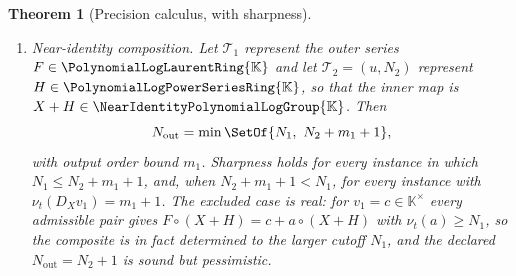 \documentclass[11pt,oneside]{article}
\theoremstyle{plain}
\newtheorem{theorem}{Theorem}[section]
\theoremstyle{definition}
\theoremstyle{remark}
\newcommand{\K}{\mathbb{K}}
\newcommand{\PLpow}{\PolynomialLogPowerSeriesRing{\K}}   %
\newcommand{\PLlau}{\PolynomialLogLaurentRing{\K}}       %
\newcommand{\Gnear}{\NearIdentityPolynomialLogGroup{\K}} %
\newcommand{\ordt}{\nu_{t}}                              %
\newcommand{\DX}{D_{X}}                                  %
\newcommand{\compose}{\mathbin{\circ}}
\begin{document}
\begin{theorem}[Precision calculus, with sharpness]
\begin{enumerate}
      \(m_1=0\) and \(v_1(0)\in\K^{\times}\); in that exceptional case the true
      order is strictly larger and must be recomputed from the returned
      canonical form (\cref{plt:rmk:alg-derived-order}).
\item\label{plt:thm:alg-precision-calculus:comp}
      \emph{Near-identity composition.}  Let \(\mathcal T_1\) represent the
      outer series \(F\in\PLlau\) and let \(\mathcal T_2=(u,N_2)\) represent
      \(H\in\PLpow\), so that the inner map is \(X+H\in\Gnear\).  Then
      \[
        N_{\mathrm{out}}=\min\SetOf{N_1,\ N_2+m_1+1},
      \]
      with output order bound \(m_1\).  Sharpness holds for every instance in
      which \(N_1\le N_2+m_1+1\), and, when \(N_2+m_1+1<N_1\), for every
      instance with \(\ordt(\DX v_1)=m_1+1\).  The excluded case is real: for
      \(v_1=c\in\K^{\times}\) every admissible pair gives
      \(F\compose(X+H)=c+a\compose(X+H)\) with \(\ordt(a)\ge N_1\), so the
      composite is in fact determined to the larger cutoff \(N_1\), and the
      declared \(N_{\mathrm{out}}=N_2+1\) is sound but pessimistic.
\end{enumerate}
\end{theorem}
\end{document}
